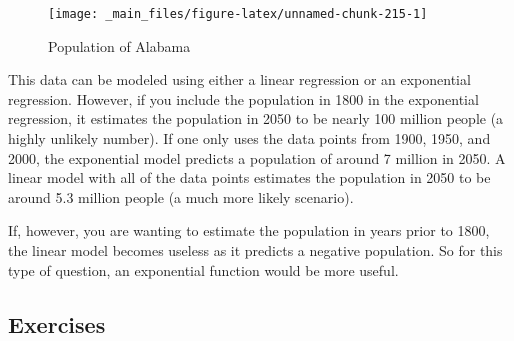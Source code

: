 \documentclass[
]{book}
\theoremstyle{definition}
\theoremstyle{definition}
\theoremstyle{definition}
\theoremstyle{remark}
\begin{document}
\begin{figure}

{\centering \texttt{[image: \_main\_files/figure-latex/unnamed-chunk-215-1]} 

}

\caption{Population of Alabama}\label{fig:unnamed-chunk-215}
\end{figure}

This data can be modeled using either a linear regression or an exponential regression. However, if you include the population in 1800 in the exponential regression, it estimates the population in 2050 to be nearly 100 million people (a highly unlikely number). If one only uses the data points from 1900, 1950, and 2000, the exponential model predicts a population of around 7 million in 2050. A linear model with all of the data points estimates the population in 2050 to be around 5.3 million people (a much more likely scenario).

If, however, you are wanting to estimate the population in years prior to 1800, the linear model becomes useless as it predicts a negative population. So for this type of question, an exponential function would be more useful.

\hypertarget{exercises-29}{%
\subsection{Exercises}\label{exercises-29}}
\end{document}
